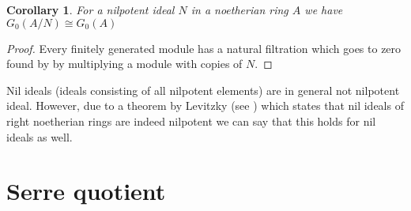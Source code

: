 \documentclass[12pt]{report}
\numberwithin{equation}{section}
\newtheorem{definition}[dummy]{Definition}
\newtheorem{corollary}[dummy]{Corollary}
\begin{document}
	\begin{corollary}
		For a nilpotent ideal $N$ in a noetherian ring $A$ we have $G_0(A/N) \cong G_0(A	)$
	\end{corollary}
	\begin{proof}
		Every finitely generated module has a natural filtration which goes to zero found by by multiplying a module with copies of $N$.
	\end{proof}	
	Nil ideals (ideals consisting of all nilpotent elements) are in general not nilpotent ideal. However, due to a theorem by Levitzky (see \cite[Theorem 10.30]{lam2001first}) which states that nil ideals of right noetherian rings are indeed nilpotent we can say that this holds for nil ideals as well.



	\section{Serre quotient}
%		
%		
%		
%		
\end{document}
